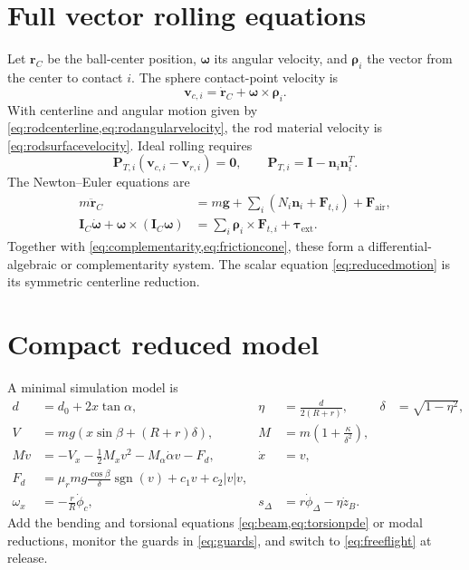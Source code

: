 \documentclass[11pt]{article}
\numberwithin{equation}{section}
\theoremstyle{definition}
\theoremstyle{remark}
\newcommand{\sgn}{\operatorname{sgn}}
\begin{document}
\appendix

\section{Full vector rolling equations}
\label{sec:vector}

Let $\bm r_C$ be the ball-center position, $\bm\omega$ its angular velocity, and $\bm\rho_i$ the vector from the center to contact $i$.  The sphere contact-point velocity is
\begin{equation}
  \bm v_{c,i}=\dot{\bm r}_C+\bm\omega\times\bm\rho_i.
\end{equation}
With centerline and angular motion given by \cref{eq:rodcenterline,eq:rodangularvelocity}, the rod material velocity is \cref{eq:rodsurfacevelocity}.  Ideal rolling requires
\begin{equation}
  \bm P_{T,i}(\bm v_{c,i}-\bm v_{r,i})=\bm 0,
  \qquad
  \bm P_{T,i}=\bm I-\bm n_i\bm n_i^T.
  \label{eq:vectorrolling}
\end{equation}
The Newton--Euler equations are
\begin{align}
  m\ddot{\bm r}_C
  &=m\bm g+\sum_i(N_i\bm n_i+\bm F_{t,i})+\bm F_{\mathrm{air}},\\
  \bm I_C\dot{\bm\omega}+\bm\omega\times(\bm I_C\bm\omega)
  &=\sum_i\bm\rho_i\times\bm F_{t,i}+\bm\tau_{\mathrm{ext}}.
  \label{eq:NewtonEuler}
\end{align}
Together with \cref{eq:complementarity,eq:frictioncone}, these form a differential-algebraic or complementarity system.  The scalar equation \cref{eq:reducedmotion} is its symmetric centerline reduction.

\section{Compact reduced model}

A minimal simulation model is
\begin{align}
  d&=d_0+2x\tan\alpha,
  &\eta&=\frac{d}{2(R+r)},
  &\delta&=\sqrt{1-\eta^2},\\
  V&=mg\left(x\sin\beta+(R+r)\delta\right),
  &M&=m\left(1+\frac{\kappa}{\delta^2}\right),\\
  M\dot v&=-V_x-\frac12M_xv^2-M_\alpha\dot\alpha v-F_d,
  &\dot x&=v,\\
  F_d&=\mu_rmg\frac{\cos\beta}{\delta}\sgn(v)+c_1v+c_2|v|v,\\
  \omega_x&=-\frac rR\dot\phi_c,
  &s_\Delta&=r\dot\phi_\Delta-\eta\dot z_B.
  \label{eq:compactmodel}
\end{align}
Add the bending and torsional equations \cref{eq:beam,eq:torsionpde} or modal reductions, monitor the guards in \cref{eq:guards}, and switch to \cref{eq:freeflight} at release.
\end{document}
